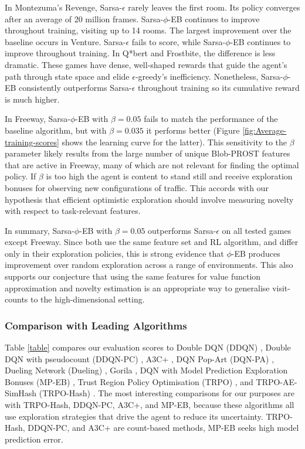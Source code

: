 \documentclass{article}
\theoremstyle{definition}
\theoremstyle{definition}
\theoremstyle{plain}
\theoremstyle{plain}
\theoremstyle{plain}
\begin{document}
 In Montezuma's Revenge, Sarsa-$\epsilon$ rarely leaves the first
room. Its policy converges after an average of 20 million frames.
Sarsa-$\phi$-EB continues to improve throughout training, visiting
up to 14 rooms. The largest improvement over the baseline occurs in
Venture. Sarsa-$\epsilon$ fails to score, while Sarsa-$\phi$-EB
continues to improve throughout training. In Q{*}bert and Frostbite,
the difference is less dramatic. These games have dense, well-shaped
rewards that guide the agent's path through state space and elide
$\epsilon$-greedy's inefficiency. Nonetheless, Sarsa-$\phi$-EB consistently
outperforms Sarsa-$\epsilon$ throughout training so its cumulative
reward is much higher. 

In Freeway, Sarsa-$\phi$-EB with $\beta=0.05$ fails to match the
performance of the baseline algorithm, but with $\beta=0.035$ it
performs better (Figure \ref{fig:Average-training-scores} shows the
learning curve for the latter). This sensitivity to the $\beta$ parameter
likely results from the large number of unique Blob-PROST features
that are active in Freeway, many of which are not relevant for finding
the optimal policy. If $\beta$ is too high the agent is content to
stand still and receive exploration bonuses for observing new configurations
of traffic. This accords with our hypothesis that efficient optimistic
exploration should involve measuring novelty with respect to task-relevant
features.

In summary, Sarsa-$\phi$-EB with $\beta=0.05$ outperforms Sarsa-$\epsilon$
on all tested games except Freeway. Since both use the same feature
set and RL algorithm, and differ only in their exploration policies,
this is strong evidence that $\phi$-EB produces improvement over
random exploration across a range of environments. This also supports
our conjecture that using the same features for value function approximation
and novelty estimation is an appropriate way to generalise visit-counts
to the high-dimensional setting.


\subsubsection*{Comparison with Leading Algorithms}

Table \ref{table} compares our evaluation scores to Double DQN (DDQN)
\cite{HGS:2016doubleQ}, Double DQN with pseudocount (DDQN-PC) \cite{Bellemare2016},
A3C+ \cite{Bellemare2016}, DQN Pop-Art (DQN-PA) \cite{DBLP:journals/corr/HasseltGHS16},
Dueling Network (Dueling) \cite{WFL:2015DQN}, Gorila \cite{DBLP:journals/corr/NairSBAFMPSBPLM15},
DQN with Model Prediction Exploration Bonuses (MP-EB) \cite{DBLP:journals/corr/StadieLA15},
Trust Region Policy Optimisation (TRPO) \cite{DBLP:journals/corr/SchulmanLMJA15},
and TRPO-AE-SimHash (TRPO-Hash) \cite{Tang2016exploration}. The most
interesting comparisons for our purposes are with TRPO-Hash, DDQN-PC,
A3C+, and MP-EB, because these algorithms all use exploration strategies
that drive the agent to reduce its uncertainty. TRPO-Hash, DDQN-PC,
and A3C+ are count-based methods, MP-EB seeks high model prediction
error.
\end{document}
